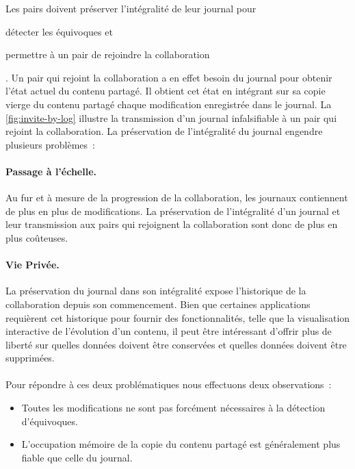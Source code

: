 Les pairs doivent préserver l'intégralité de leur journal pour \begin{inlinelist}
\item détecter les équivoques et
\item permettre à un pair de rejoindre la collaboration
\end{inlinelist}.
Un pair qui rejoint la collaboration a en effet besoin du journal pour obtenir l'état actuel du contenu partagé.
Il obtient cet état en intégrant sur sa copie vierge du contenu partagé chaque modification enregistrée dans le journal.
La \autoref{fig:invite-by-log} illustre la transmission d'un journal infalsifiable à un pair qui rejoint la collaboration.
La préservation de l'intégralité du journal engendre plusieurs problèmes~:

\paragraph{Passage à l'échelle.} Au fur et à mesure de la progression de la collaboration, les journaux contiennent de plus en plus de modifications.
La préservation de l'intégralité d'un journal et leur transmission aux pairs qui rejoignent la collaboration sont donc de plus en plus coûteuses.

\paragraph{Vie Privée.} La préservation du journal dans son intégralité expose l'historique de la collaboration depuis son commencement.
Bien que certaines applications requièrent cet historique pour fournir des fonctionnalités, telle que la visualisation interactive de l'évolution d'un contenu, il peut être intéressant d'offrir plus de liberté sur quelles données doivent être conservées et quelles données doivent être supprimées.

\paragraph{} Pour répondre à ces deux problématiques nous effectuons deux observations~:
\begin{itemize}
    \item Toutes les modifications ne sont pas forcément nécessaires à la détection d'équivoques.
    \item L'occupation mémoire de la copie du contenu partagé est généralement plus fiable que celle du journal.
\end{itemize}

